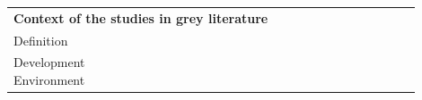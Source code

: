 \documentclass[english, 12pt, a4paper, sci, utf8, a-1b, online]{aaltothesis}
\begin{document}
{\begin{center}
\begin{longtable}{p{0.3\linewidth}p{0.6\linewidth}}
      \multicolumn{2}{l}{\textbf{Context of the studies in grey literature}}                                                                                                                                                                                                                                                                                                                                                                                                                                                                                                                                                                                                                                                                                                                                                                                                              \\*
      Definition                        & \textcite{how-i-missed-it-before} \newline \textcite{effective-developer-experience} \newline \textcite{what-is-api-developer-experience-and-why-it-matters} \newline \textcite{what-is-developer-experience-everydeveloper} \newline \textcite{what-exactly-is-developer-experience}                                                                                                                                                                                                                                                                                                                                                                                                                                                                                                                                                           \\
      Development Environment           & \textcite{how-i-missed-it-before} \newline \textcite{workflows-for-the-new-developer-experience}                                                                                                                                                                                                                                                                                                                                                                                                                                                                                                                                                                                                                                                                                                                                                \\

\end{longtable}
\end{center}}
\end{document}
